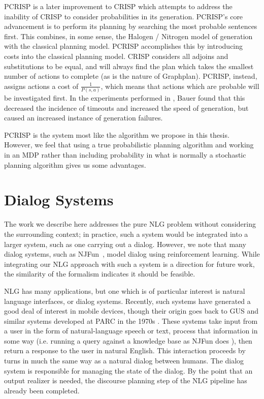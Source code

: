 PCRISP \cite{bauer_sentence_2010} is a later improvement to
CRISP which attempts to address the inability of CRISP to consider
probabilities in its generation.  PCRISP's core advancement is
to perform its planning by searching the most probable sentences
first.  This combines, in some sense, the Halogen / Nitrogen model
of generation with the classical planning model.  PCRISP accomplishes
this by introducing costs into the classical planning model.
CRISP considers all adjoins and substitutions to be equal, and
will always find the plan which takes the smallest number of actions
to complete (as is the nature of Graphplan).  PCRISP, instead,
assigns actions a cost of $\frac{1}{P(s,a)}$, which means that
actions which are probable will be investigated first.  In the
experiments performed in \cite{bauer2009statistical},
Bauer found that this decreased the incidence of timeouts and
increased the speed of generation, but caused an increased instance of
generation failures.

PCRISP is the system most like the algorithm we propose in this thesis.
However, we feel that using a true probabilistic planning algorithm
and working in an MDP rather than including probability in what
is normally a stochastic planning algorithm gives us some advantages.

\section{Dialog Systems}

The work we describe here addresses the pure NLG problem without
considering the surrounding context; in practice, such a system would
be integrated into a larger system, such as one carrying out a
dialog. However, we note that many dialog systems, such as
NJFun~\cite{litman_njfun_2000}, model dialog using reinforcement
learning. While integrating our NLG approach with such a system is a
direction for future work, the similarity of the formalism indicates
it should be feasible.

NLG has many applications, but one which is of particular interest is
natural language interfaces, or dialog systems.  Recently, such
systems have generated a good deal of interest in mobile devices,
though their origin goes back to GUS and similar systems developed at PARC
in the 1970s \cite{bobrow_gus_1977}.  These systems take input from a user
in the form of natural-language speech or text, process that information in 
some way (i.e. running a query against a knowledge base as NJFun does
\cite{litman_njfun_2000}), then return a response to the user in
natural English.  This interaction proceeds by turns in much the same way
as a natural dialog between humans.  The dialog system is responsible
for managing the state of the dialog.  By the point that an output realizer is 
needed, the discourse planning step of the NLG pipeline has already been
completed.